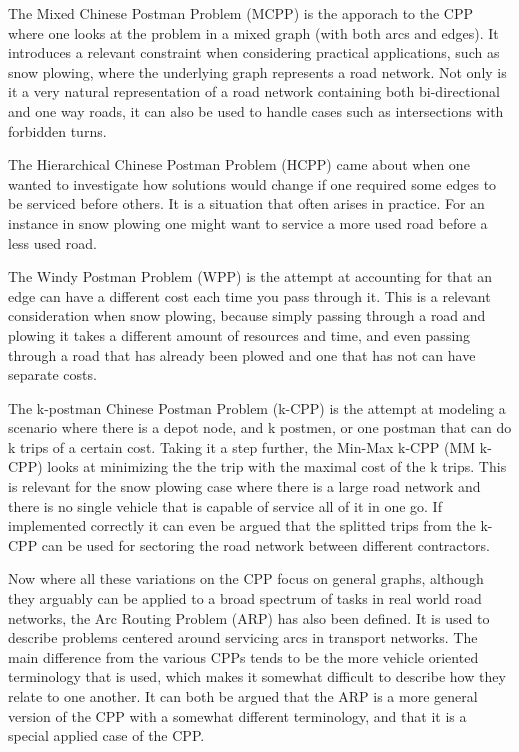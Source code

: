 The Mixed Chinese Postman Problem (MCPP) is the apporach to the CPP where one looks at the problem in a mixed graph (with both arcs and edges). It introduces a relevant constraint when considering practical applications, such as snow plowing, where the underlying graph represents a road network. Not only is it a very natural representation of a road network containing both bi-directional and one way roads, it can also be used to handle cases such as intersections with forbidden turns.

The Hierarchical Chinese Postman Problem (HCPP) came about when one wanted to investigate how solutions would change if one required some edges to be serviced before others. It is a situation that often arises in practice. For an instance in snow plowing one might want to service a more used road before a less used road.

The Windy Postman Problem (WPP) is the attempt at accounting for that an edge can have a different cost each time you pass through it. This is a relevant consideration when snow plowing, because simply passing through a road and plowing it takes a different amount of resources and time, and even passing through a road that has already been plowed and one that has not can have separate costs.

The k-postman Chinese Postman Problem (k-CPP) is the attempt at modeling a scenario where there is a depot node, and k postmen, or one postman that can do k trips of a certain cost. Taking it a step further, the Min-Max k-CPP (MM k-CPP) looks at minimizing the the trip with the maximal cost of the k trips. This is relevant for the snow plowing case where there is a large road network and there is no single vehicle that is capable of service all of it in one go. If implemented correctly it can even be argued that the splitted trips from the k-CPP can be used for sectoring the road network between different contractors.

Now where all these variations on the CPP focus on general graphs, although they arguably can be applied to a broad spectrum of tasks in real world road networks, the Arc Routing Problem (ARP) has also been defined. It is used to describe problems centered around servicing arcs in transport networks. The main difference from the various CPPs tends to be the more vehicle oriented terminology that is used, which makes it somewhat difficult to describe how they relate to one another. It can both be argued that the ARP is a more general version of the CPP with a somewhat different terminology, and that it is a special applied case of the CPP.

